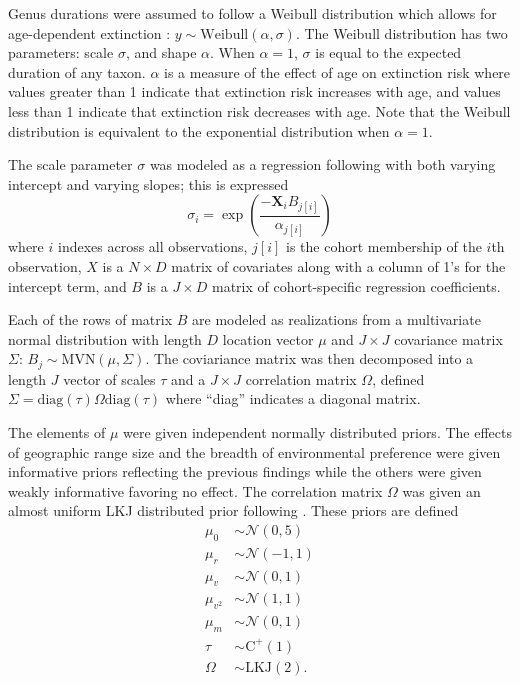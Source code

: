 \documentclass{article}
\begin{document}
Genus durations were assumed to follow a Weibull distribution which allows for age-dependent extinction \citep{Klein2003}: \(y \sim \mathrm{Weibull}(\alpha, \sigma)\). The Weibull distribution has two parameters: scale \(\sigma\), and shape \(\alpha\). When \(\alpha = 1\), \(\sigma\) is equal to the expected duration of any taxon. \(\alpha\) is a measure of the effect of age on extinction risk where values greater than 1 indicate that extinction risk increases with age, and values less than 1 indicate that extinction risk decreases with age. Note that the Weibull distribution is equivalent to the exponential distribution when \(\alpha = 1\). 

The scale parameter \(\sigma\) was modeled as a regression following \citet{Kleinbaum2005} with both varying intercept and varying slopes; this is expressed
\begin{equation}
  \sigma_{i} = \exp\left(\frac{-\mathbf{X}_{i} B_{j[i]}}{\alpha_{j[i]}}\right)
  \label{eq:sigma}
\end{equation}
where \(i\) indexes across all observations, \(j[i]\) is the cohort membership of the \(i\)th observation, \(X\) is a \(N \times D\) matrix of covariates along with a column of 1's for the intercept term, and \(B\) is a \(J \times D\) matrix of cohort-specific regression coefficients.

Each of the rows of matrix \(B\) are modeled as realizations from a multivariate normal distribution with length \(D\) location vector \(\mu\) and \(J \times J\) covariance matrix \(\Sigma\): \(B_{j} \sim \mathrm{MVN}(\mu, \Sigma)\). The coviariance matrix was then decomposed into a length \(J\) vector of scales \(\tau\) and a \(J \times J\) correlation matrix \(\Omega\), defined \(\Sigma = \mathrm{diag}(\tau) \Omega \mathrm{diag}(\tau)\) where ``diag'' indicates a diagonal matrix.

The elements of \(\mu\) were given independent normally distributed priors. The effects of geographic range size  and the breadth of environmental preference were given informative priors reflecting the previous findings while the others were given weakly informative favoring no effect. The correlation matrix \(\Omega\) was given an almost uniform LKJ distributed prior following \citep{Team2016}. These priors are defined
\begin{equation*}
  \begin{aligned}
    \mu_{0} &\sim \mathcal{N}(0, 5) \\
    \mu_{r} &\sim \mathcal{N}(-1, 1) \\
    \mu_{v} &\sim \mathcal{N}(0, 1) \\
    \mu_{v^{2}} &\sim \mathcal{N}(1, 1) \\
    \mu_{m} &\sim \mathcal{N}(0, 1) \\
    \tau &\sim \mathrm{C^{+}}(1) \\
    \Omega &\sim \text{LKJ}(2).
  \end{aligned}
  \label{eq:sigma_prior}
\end{equation*}
\end{document}
